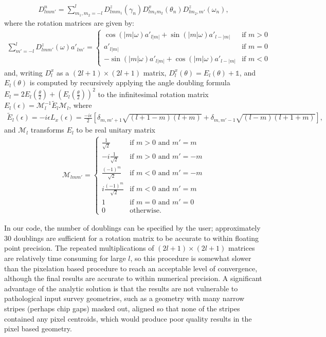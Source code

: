 \documentclass[a4paper,11pt]{article}
\begin{document}
\begin{align}\label{composite_rotation}
D^n_{l m m'}=\sum_{m_1,m_2=-l}^{l}{D^z_{l m m_1}(\gamma_n)D^x_{l m_1 m_2}(\theta_n)D^z_{l m_2,m'}}(\omega_n),
\end{align}
where the rotation matrices are given by:
\begin{align}\label{rot_z}
\sum_{m'=-l}^l{D^z_{l m m'}(\omega) a'_{l m'}= 
\begin{cases}
\cos(|m|\omega)a'_{l |m|}+\sin(|m|\omega)a'_{l -|m|}&\text{if } m>0\\
a'_{l |m|}&\text{if } m=0\\
-\sin(|m|\omega)a'_{l |m|}+\cos(|m|\omega)a'_{l -|m|}&\text{if } m<0
\end{cases}}
\end{align}
and, writing $D^x_{l}$ as a $(2l+1)\times (2l+1)$ matrix, $D^x_{l}(\theta)=E_{l}(\theta)+\mathbb{1}$, and $E_{l}(\theta)$ is computed by recursively applying the angle doubling formula $E_{l} = 2 E_{l}(\frac{\theta}{2})+\left(E_{l}(\frac{\theta}{2})\right)^2$ to the infinitesimal rotation matrix $E_{l}(\epsilon)=\mathcal{M}_l^{-1}\tilde{E}_{l}\mathcal{M}_l$, where 
\begin{align}\label{E_complex}
\tilde{E}_l(\epsilon)=-i\epsilon L_x(\epsilon)=\frac{-i\epsilon}{2}\left[\delta_{m,m'+1}\sqrt{(l+1-m)(l+m)}+\delta_{m,m'-1}\sqrt{(l-m)(l+1+m)}\right],
\end{align}
and $\mathcal{M}_l$ transforms $E_{l}$ to be real unitary matrix
\begin{align}\label{m_mat}
\mathcal{M}_{l m m'}=
\begin{cases}
\frac{1}{\sqrt{2}}&\text{if } m>0\text{ and } m'=m\\
-i\frac{1}{\sqrt{2}}&\text{if } m>0\text{ and } m'=-m\\
\frac{(-1)^m}{\sqrt{2}}&\text{if } m<0\text{ and } m'=-m\\
i\frac{(-1)^m}{\sqrt{2}}&\text{if } m<0\text{ and } m'=m\\
1&\text{if } m=0\text{ and } m'=0\\
0&\text{otherwise}.
\end{cases}
\end{align}

In our code, the number of doublings can be specified by the user;  approximately 30 doublings are sufficient for a rotation matrix to be accurate to within floating point precision. The repeated multiplications of $(2l+1)\times (2l+1)$ matrices are relatively time consuming for large $l$, so this procedure is somewhat slower than the pixelation based procedure to reach an acceptable level of convergence, although the final results are accurate to within numerical precision. A significant advantage of the analytic solution is that the results are not vulnerable to pathological input survey geometries, such as a geometry with many narrow stripes (perhaps chip gaps) masked out, aligned so that none of the stripes contained any pixel centroids, which would produce poor quality results in the pixel based geometry.
\end{document}
